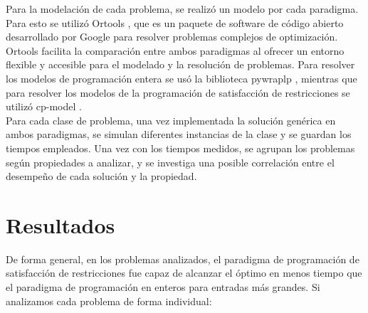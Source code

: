 \documentclass[12pt]{report}
\begin{document}
Para la modelación de cada problema, se realizó un modelo por cada paradigma. Para esto se utilizó Ortools \cite{Ortools}, que es un paquete de software de código abierto desarrollado por Google para resolver problemas complejos de optimización. Ortools facilita la comparación entre ambos paradigmas al ofrecer un entorno flexible y accesible para el modelado y la resolución de problemas. Para resolver los modelos de programación entera se usó la biblioteca pywraplp \cite{pyw}, mientras que para resolver los modelos de la programación de satisfacción de  restricciones se utilizó cp-model \cite{CP-Model}.\\

Para cada clase de problema, una vez implementada la solución genérica en ambos paradigmas, se simulan diferentes instancias de la clase y se guardan los tiempos empleados. Una vez con los tiempos medidos, se agrupan los problemas según propiedades a analizar, y se investiga una posible correlación entre el desempeño de cada solución y la propiedad.

\chapter{Resultados}

De forma general, en los problemas analizados, el paradigma de programación de satisfacción de restricciones fue capaz de alcanzar el óptimo en menos tiempo que el paradigma de programación en enteros para entradas más grandes. Si analizamos cada problema de forma individual:
\end{document}
